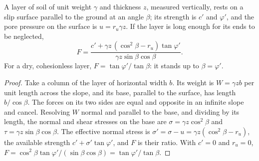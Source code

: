 \begin{proposition}\label{prop:b2:geological-hazards:infinite-slope}
A layer of soil of unit weight $\gamma$ and thickness $z$, measured vertically, rests on a slip
surface parallel to the ground at an angle $\beta$; its strength is $c'$ and $\varphi'$, and the
pore pressure on the surface is $u = r_u \gamma z$. If the layer is long enough for its ends to be
neglected,
\begin{equation}
F = \frac{c' + \gamma z\,(\cos^2\beta - r_u)\tan\varphi'}{\gamma z \sin\beta\cos\beta}.
\label{eq:b2:geological-hazards:infinite-slope}
\end{equation}
For a dry, cohesionless layer, $F = \tan\varphi'/\tan\beta$: it stands up to $\beta = \varphi'$.
\end{proposition}

\begin{proof}
Take a column of the layer of horizontal width $b$. Its weight is $W = \gamma z b$ per unit length
across the slope, and its base, parallel to the surface, has length $b/\cos\beta$. The forces on
its two sides are equal and opposite in an infinite slope and cancel. Resolving $W$ normal and
parallel to the base, and dividing by its length, the normal and shear stresses on the base are
$\sigma = \gamma z\cos^2\beta$ and $\tau = \gamma z \sin\beta\cos\beta$. The effective normal
stress is $\sigma' = \sigma - u = \gamma z(\cos^2\beta - r_u)$, the available strength $c' +
\sigma'\tan\varphi'$, and $F$ is their ratio. With $c' = 0$ and $r_u = 0$, $F = \cos^2\beta
\tan\varphi'/(\sin\beta\cos\beta) = \tan\varphi'/\tan\beta$.
\end{proof}

